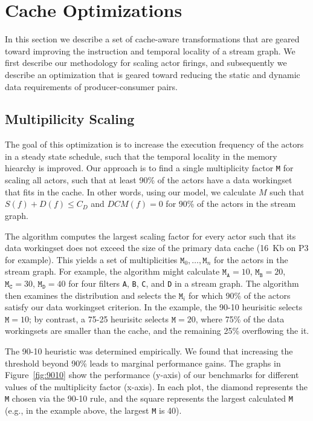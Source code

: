 \section{Cache Optimizations}
\label{sec:cache-opt}

In this section we describe a set of cache-aware transformations that
are geared toward improving the instruction and temporal locality of a
stream graph. We first describe our methodology for scaling actor
firings, and subsequently we describe an optimization that is geared
toward reducing the static and dynamic data requirements of
producer-consumer pairs.



\subsection{Multipilicity Scaling}

The goal of this optimization is to increase the execution frequency
of the actors in a steady state schedule, such that the temporal
locality in the memory hiearchy is improved. Our approach is to find a
single multiplicity factor \texttt{M} for scaling all actors, such that
at least 90\% of the actors have a data workingset that fits in the cache.
In other words, using our model, we calculate $M$ such that 
$S(f) + D(f) \leq C_D$ and $DCM(f) = 0$ for 90\% of the actors in the
stream graph.

The algorithm 
computes the largest scaling factor for every actor such that its data
workingset does not exceed the size of the primary data cache
(16~Kb on P3 for example). This yields a set of multiplicities
${\texttt{M}_0, \ldots, \texttt{M}_n}$ for the actors in the stream
graph. For example, the algorithm might calculate
$\texttt{M}_\texttt{A} = 10$,
$\texttt{M}_\texttt{B} = 20$, 
$\texttt{M}_\texttt{C} = 30$, 
$\texttt{M}_\texttt{D} = 40$ for four filters \texttt{A}, \texttt{B},
\texttt{C}, and \texttt{D} in a stream graph.
The algorithm then examines the
distribution and selects the $\texttt{M}_i$
for which 90\% of the actors satisfy our data workingset criterion.
In the example, the 90-10 heurisitic
selects $\texttt{M} = 10$; by contrast,
a 75-25 heurisitc selects $\texttt{M} = 20$, where 75\% of the
data workingsets are smaller than the cache, and the remaining 25\%
overflowing the it.

The 90-10 heuristic was determined empirically. We found that
increasing the threshold beyond 90\% leads to marginal
performance gains. The graphs in Figure~\ref{fig:9010} show the
performance (y-axis) of our benchmarks for different values of the multiplicity
factor (x-axis). In each plot, the diamond represents the \texttt{M} chosen via
the 90-10 rule, and the square represents the largest calculated
\texttt{M} (e.g., in the example above, the largest \texttt{M} is 40).

